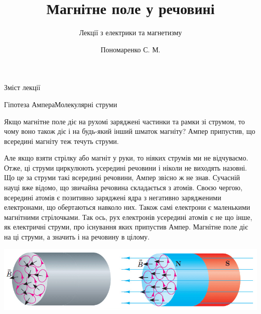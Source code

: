 \documentclass{beamer}
\title[Лекції електрики та магнетизму]{\huge\bfseries Магнітне поле у речовині}
\subtitle{Лекції з електрики та магнетизму}
\author{Пономаренко С. М.}
\date{}
\begin{document}
\begin{frame}[plain]
	\maketitle
\end{frame}

\begin{frame}{Зміст лекції}{}
	\tableofcontents
\end{frame}


\begin{frame}{Гіпотеза Ампера}{Молекулярні струми}
	\begin{block}{}\justifying
		Якщо магнітне поле діє на рухомі заряджені частинки та рамки зі струмом, то \alert{чому воно також діє і на будь-який інший
			шматок магніту}? Ампер припустив, що \alert{всередині магніту теж течуть струми}.
	\end{block}


	\begin{block}{}\justifying\scriptsize
		Але якщо взяти стрілку або магніт у руки, то ніяких струмів ми не відчуваємо. Отже,  ці струми циркулюють усередині речовини і
		ніколи не виходять назовні. Що це за струми такі всередині речовини, Ампер звісно ж не знав. Сучасній науці вже відомо, що звичайна речовина
		складається з атомів. Своєю чергою, всередині атомів є позитивно заряджені ядра з негативно зарядженими електронами, що обертаються навколо них.
		Також самі електрони є маленькими магнітними стрілочками. Так
		ось, рух електронів усередині атомів є не що інше, як електричні струми, про існування яких припустив Ампер. Магнітне поле діє на ці струми, а
		значить і на речовину в цілому.
	\end{block}


	\begin{center}
		\includegraphics[width=1\linewidth]{AmpereHypotesis}
	\end{center}

\end{frame}
\end{document}
